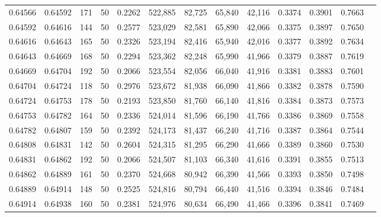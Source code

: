 \begin{tabular}{rrrrrrrrrrrrr}
0.64566 & 0.64592 &   171 &  50 &                                     0.2262 & 522,885 &  82,725 &  65,840 &  42,116 & 0.3374 & 0.3901 & 0.7663 \\
0.64592 & 0.64616 &   144 &  50 &                                     0.2577 & 523,029 &  82,581 &  65,890 &  42,066 & 0.3375 & 0.3897 & 0.7650 \\
0.64616 & 0.64643 &   165 &  50 &                                     0.2326 & 523,194 &  82,416 &  65,940 &  42,016 & 0.3377 & 0.3892 & 0.7634 \\
0.64643 & 0.64669 &   168 &  50 &                                     0.2294 & 523,362 &  82,248 &  65,990 &  41,966 & 0.3379 & 0.3887 & 0.7619 \\
0.64669 & 0.64704 &   192 &  50 &                                     0.2066 & 523,554 &  82,056 &  66,040 &  41,916 & 0.3381 & 0.3883 & 0.7601 \\
0.64704 & 0.64724 &   118 &  50 &                                     0.2976 & 523,672 &  81,938 &  66,090 &  41,866 & 0.3382 & 0.3878 & 0.7590 \\
0.64724 & 0.64753 &   178 &  50 &                                     0.2193 & 523,850 &  81,760 &  66,140 &  41,816 & 0.3384 & 0.3873 & 0.7573 \\
0.64753 & 0.64782 &   164 &  50 &                                     0.2336 & 524,014 &  81,596 &  66,190 &  41,766 & 0.3386 & 0.3869 & 0.7558 \\
0.64782 & 0.64807 &   159 &  50 &                                     0.2392 & 524,173 &  81,437 &  66,240 &  41,716 & 0.3387 & 0.3864 & 0.7544 \\
0.64808 & 0.64831 &   142 &  50 &                                     0.2604 & 524,315 &  81,295 &  66,290 &  41,666 & 0.3389 & 0.3860 & 0.7530 \\
0.64831 & 0.64862 &   192 &  50 &                                     0.2066 & 524,507 &  81,103 &  66,340 &  41,616 & 0.3391 & 0.3855 & 0.7513 \\
0.64862 & 0.64889 &   161 &  50 &                                     0.2370 & 524,668 &  80,942 &  66,390 &  41,566 & 0.3393 & 0.3850 & 0.7498 \\
0.64889 & 0.64914 &   148 &  50 &                                     0.2525 & 524,816 &  80,794 &  66,440 &  41,516 & 0.3394 & 0.3846 & 0.7484 \\
0.64914 & 0.64938 &   160 &  50 &                                     0.2381 & 524,976 &  80,634 &  66,490 &  41,466 & 0.3396 & 0.3841 & 0.7469 \\

\end{tabular}
